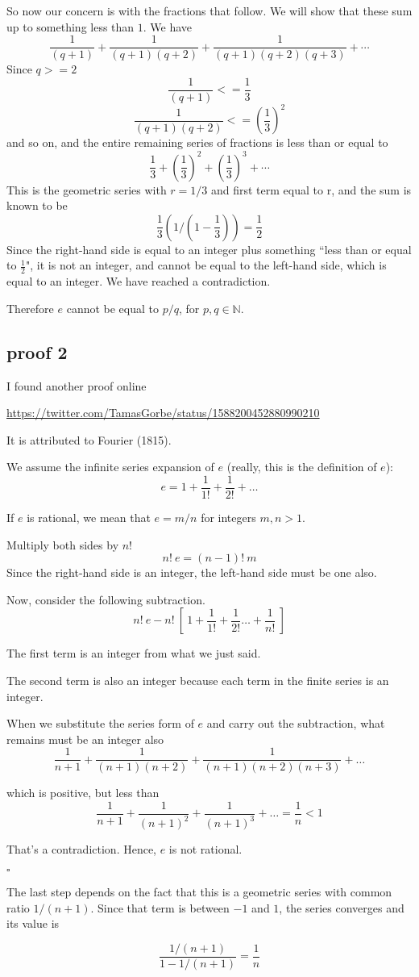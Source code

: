 \documentclass[11pt, oneside]{article}
\begin{document}
So now our concern is with the fractions that follow.  We will show that these sum up to something less than $1$.  We have
\[ \frac{1}{(q+1)} + \frac{1}{(q+1)(q+2)} + \frac{1}{(q+1)(q+2)(q+3)} + \cdots \]
Since $q >= 2$
\[ \frac{1}{(q+1)} <= \frac{1}{3} \]
\[ \frac{1}{(q+1)(q+2)} <= (\frac{1}{3})^2 \]
and so on, and the entire remaining series of fractions is less than or equal to
\[ \frac{1}{3} + (\frac{1}{3})^2 + (\frac{1}{3})^3 + \cdots \]
This is the geometric series with $r = 1/3$ and first term equal to r, and the sum is known to be
\[ \frac{1}{3} ( 1 / (1-\frac{1}{3}) ) = \frac{1}{2} \]
Since the right-hand side is equal to an integer plus something ``less than or equal to $\frac{1}{2}$", it is not an integer, and cannot be equal to the left-hand side, which is equal to an integer.  We have reached a contradiction.  

Therefore $e$ cannot be equal to $p/q$, for $p,q \in \mathbb{N}$.

\subsection*{proof 2}

I found another proof online

\url{https://twitter.com/TamasGorbe/status/1588200452880990210}

It is attributed to Fourier (1815).

We assume the infinite series expansion of $e$ (really, this is the definition of $e$):
\[ e = 1 + \frac{1}{1!} + \frac{1}{2!} + \dots \]

If $e$ is rational, we mean that $e = m/n$ for integers $m,n > 1$.  

Multiply both sides by $n!$
\[ n! \ e = (n-1)! \ m \]
Since the right-hand side is an integer, the left-hand side must be one also.  

Now, consider the following subtraction.
\[ n! \ e - n! \ [ \ 1 + \frac{1}{1!} + \frac{1}{2!} \dots + \frac{1}{n!} \  ] \]

The first term is an integer from what we just said.

The second term is also an integer because each term in the finite series is an integer.  

When we substitute the series form of $e$ and carry out the subtraction, what remains must be an integer also
\[ \frac{1}{n+1} + \frac{1}{(n+1)(n+2)} + \frac{1}{(n+1)(n+2)(n+3)}  + \dots \]

which is positive, but less than
\[ \frac{1}{n+1} + \frac{1}{(n+1)^2} + \frac{1}{(n+1)^3}  + \dots = \frac{1}{n} < 1 \]

That's a contradiction.  Hence, $e$ is not rational.

$\square$

The last step depends on the fact that this is a geometric series with common ratio $1/(n+1)$.  Since that term is between $-1$ and $1$, the series converges and its value is 

\[ \frac{1/(n+1)}{1 - 1/(n+1)} = \frac{1}{n} \]
\end{document}
